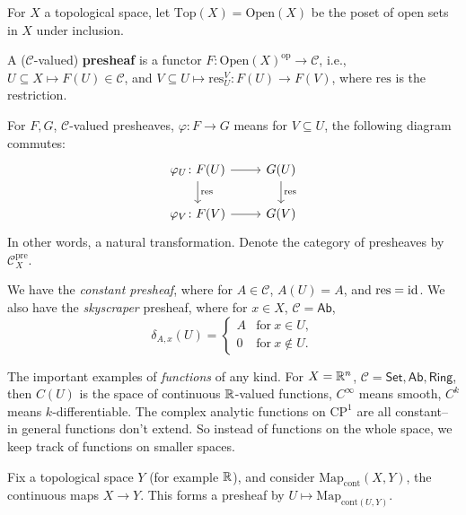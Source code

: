 \begin{definition}[]
    For $X$ a topological space, let $\mathrm{Top}(X)= \mathrm{Open}(X)$ be the poset of open sets in $X$ under inclusion.
\end{definition}
\begin{definition}[]
    A ($\mathcal{C} $-valued) \textbf{presheaf}  is a functor $F \colon \mathrm{Open}(X)^{\mathrm{op}} \to \mathcal{C} $, i.e., $U \subseteq X \mapsto F(U) \in \mathcal{C} $, and $V \subseteq U \mapsto  \mathrm{res}_U^V \colon F(U) \to F(V)$, where $\mathrm{res}$ is the restriction.
\end{definition}
For $F,G$, $\mathcal{C} $-valued presheaves, $\varphi \colon F \to G$ means for $V \subseteq U$, the following diagram commutes:
\[
    \begin{tikzcd}
\varphi_U \colon F(U) \arrow[r] \arrow[d, "\mathrm{res}"] & G(U) \arrow[d, "\mathrm{res}"] \\
\varphi_V \colon F(V) \arrow[r]                           & G(V)                          
\end{tikzcd}
\] 
In other words, a natural transformation. Denote the category of presheaves by $\mathcal{C} _X ^{\mathrm{pre}}$.
\begin{example}
    We have the \emph{constant presheaf}, where for $A \in \mathcal{C} $, $A(U)=A$, and $\mathrm{res}=\operatorname{id}$. We also have the \emph{skyscraper} presheaf, where for $x \in X$, $\mathcal{C} =\mathsf{Ab} $,\[
        \delta _{A,x}(U) = 
        \begin{cases}
            A & \text{for} \ x \in U,\\
            0 & \text{for} \ x \notin U.
        \end{cases}
    \] 
\end{example}
\begin{example}
    The important examples of \emph{functions} of any kind. For $X= \mathbb{R}^n $, $\mathcal{C} =\mathsf{Set} , \mathsf{Ab}, \mathsf{Ring} $, then $C(U)$ is the space of continuous $\mathbb{R}$-valued functions, $C^{\infty}$ means smooth, $C^{k}$ means $k$-differentiable. The complex analytic functions on $\mathrm{C}\mathrm{P} ^1$ are all constant-- in general functions don't extend. So instead of functions on the whole space, we keep track of functions on smaller spaces. 
\end{example}
\begin{example}
    Fix a topological space $Y$ (for example $\mathbb{R}$), and consider $\mathrm{Map}_{\mathrm{cont}}(X,Y)$, the continuous maps $X \to Y$. This forms a presheaf by $U \mapsto \mathrm{Map}_{\mathrm{cont}(U,Y)}$.
\end{example}
